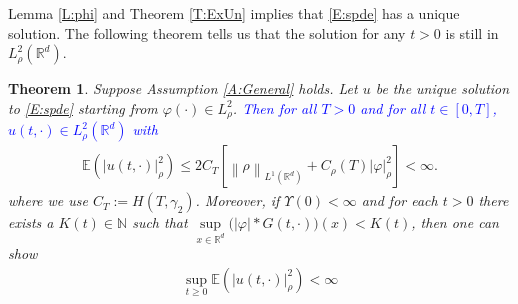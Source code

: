 \documentclass[a4paper,11pt]{article}%
\numberwithin{equation}{section}
\theoremstyle{plain}
\newtheorem{theorem}{Theorem}[section]
\theoremstyle{definition}
\newcommand{\R}{\mathbb{R}}
\newcommand{\E}{\mathbb{E}}
\newcommand{\Norm}[1]{\left\|  #1   \right\|}
\begin{document}
Lemma \ref{L:phi} and Theorem \ref{T:ExUn} implies that \eqref{E:spde} has a unique solution.
The following theorem tells us that the solution for any $t>0$ is still in $L_\rho^2(\R^d)$.

\begin{theorem}
	\label{T:Moment}
	Suppose Assumption \ref{A:General} holds.
	Let $u$ be the unique solution to \eqref{E:spde} starting from  $\varphi(\cdot) \in L^2_\rho$.
	\textcolor{blue}{Then for all $T>0$ and for all $t \in [0,T]$, $u(t,\cdot)\in L^2_\rho(\R^d)$ with}
	\begin{align}
		\label{E:uNormRho}
		\E\left(| u(t,\cdot)|_\rho^2\right)
		\le  2 C_T \left[ \Norm{\rho}_{L^1(\R^d)} + C_\rho(T) |\varphi|_{\rho}^2 \right]<\infty.
	\end{align}
	where we use $C_T:= H(T,\gamma_2)$. Moreover, if $\Upsilon(0)<\infty$ and
	 for each $t>0$ there exists a $K(t) \in \mathbb N$ such that $\sup\limits_{x\in \R^d}\big(|\varphi|*G(t,\cdot)\big)(x) < K(t)$, then one can show
	\begin{align*}
		\sup_{t\ge 0}\E\left(|u(t,\cdot)|_\rho^2\right) < \infty
	\end{align*}
\end{theorem}
\end{document}
